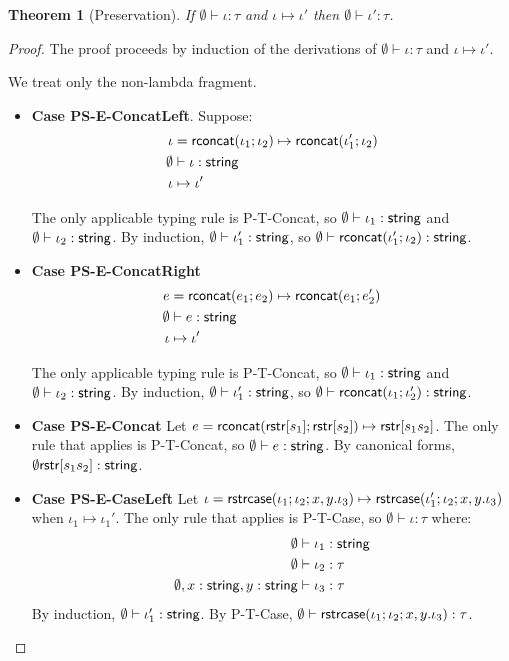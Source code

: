 \documentclass[11pt,leqno]{article}
\newtheorem{thm}{Theorem}
\theoremstyle{definition}
\newcommand{\str}{{\sf string}}
\newcommand{\strcase}[3]{ {\sf rstrcase}(#1; #2; #3)}
\begin{document}
\begin{thm}[Preservation]
If $\emptyset \vdash \iota : \tau$ and $\iota \mapsto \iota'$ then $\emptyset \vdash \iota' : \tau$.
\end{thm}
\begin{proof}

The proof proceeds by induction of the derivations of $\emptyset \vdash \iota : \tau$
and $\iota \mapsto \iota'$.

We treat only the non-lambda fragment.

\begin{itemize}[label=$ $,itemsep=1ex]

\item \textbf{Case PS-E-ConcatLeft}.
Suppose:
\begin{align*}
  \iota &= \rconcat{\iota_1}{\iota_2} \mapsto \rconcat{\iota_1'}{\iota_2} \\
  \emptyset &\vdash \iota : \str \\
  \iota &\mapsto \iota' 
\end{align*}

The only applicable typing rule is P-T-Concat, so $\emptyset \vdash \iota_1 : \str$
and $\emptyset \vdash \iota_2 : \str$. 
By induction, $\emptyset \vdash \iota_1' : \str$,
so $\emptyset \vdash \rconcat{\iota_1'}{\iota_2} : \str$.

\item \textbf{Case PS-E-ConcatRight}
\begin{align*}
  e &= \rconcat{e_1}{e_2} \mapsto \rconcat{e_1}{e_2'} \\
  \emptyset &\vdash e : \str \\
  \iota &\mapsto \iota' 
\end{align*}

The only applicable typing rule is P-T-Concat, so $\emptyset \vdash \iota_1 : \str$
and $\emptyset \vdash \iota_2 : \str$. 
By induction, $\emptyset \vdash \iota_1' : \str$,
so $\emptyset \vdash \rconcat{\iota_1}{\iota_2'} : \str$.

\item \textbf{Case PS-E-Concat}
Let $e = {\sf rconcat}({\sf rstr}[s_1];{\sf rstr}[s_2]) \mapsto {\sf rstr}[s_1s_2]$. 
The only rule that applies is P-T-Concat, so $\emptyset \vdash e : \str$.
By canonical forms, $\emptyset \rstr{s_1s_2} : \str$.

\item \textbf{Case PS-E-CaseLeft}
Let $\iota = \strcase{\iota_1}{\iota_2}{x,y.\iota_3} \mapsto \strcase{\iota_1'}{\iota_2}{x,y.\iota_3}$
when $\iota_1 \mapsto \iota_1'$.
The only rule that applies is P-T-Case, so $\emptyset \vdash \iota : \tau$ where:
\begin{align*}
  \emptyset &\vdash \iota_1 : \str  \\
  \emptyset &\vdash \iota_2 : \tau \\
  \emptyset, x : \str, y : \str &\vdash \iota_3 : \tau 
\end{align*}
By induction, $\emptyset \vdash \iota_1' : \str$.
By P-T-Case, $\emptyset \vdash \strcase{\iota_1}{\iota_2}{x,y.\iota_3} : \tau$.


\end{itemize}
\end{proof}
\end{document}
